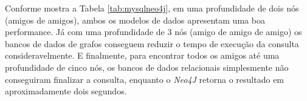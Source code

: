 Conforme mostra a Tabela \ref{tab:mysqlneo4j}, em uma profundidade de dois nós (amigos de amigos), ambos os modelos de dados apresentam uma boa performance. Já com uma profundidade de 3 nós (amigo de amigo de amigo) os bancos de dados de grafos conseguem reduzir o tempo de execução da consulta consideravelmente. E finalmente, para encontrar todos os amigos até uma profundidade de cinco nós, os bancos de dados relacionais simplesmente não conseguiram finalizar a consulta, enquanto o \textit{Neo4J} retorna o resultado em aproximadamente dois segundos.

\begin{table}[!h]
\centering
  \large
  \setlength{\arrayrulewidth}{2\arrayrulewidth}
  \setlength{\belowcaptionskip}{10pt}
  \caption{\ Comparação MySQL versus Neo4J. \cite{partner2013neo4j}}
\label{tab:mysqlneo4j}
\end{table}


